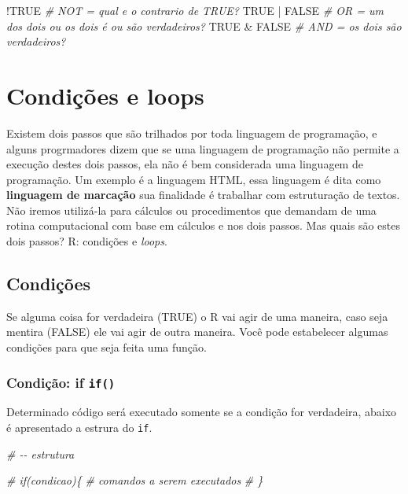 \documentclass[
]{book}
\newenvironment{Shaded}{\begin{snugshade}}{\end{snugshade}}
\newcommand{\CommentTok}[1]{\textcolor[rgb]{0.56,0.35,0.01}{\textit{#1}}}
\newcommand{\ConstantTok}[1]{\textcolor[rgb]{0.00,0.00,0.00}{#1}}
\newcommand{\SpecialCharTok}[1]{\textcolor[rgb]{0.00,0.00,0.00}{#1}}
\begin{document}
\begin{Shaded}
\begin{Highlighting}[]
\SpecialCharTok{!}\ConstantTok{TRUE} \CommentTok{\# NOT = qual e o contrario de TRUE?}
\ConstantTok{TRUE} \SpecialCharTok{|} \ConstantTok{FALSE} \CommentTok{\# OR = um dos dois ou os dois é ou são verdadeiros?}
\ConstantTok{TRUE} \SpecialCharTok{\&} \ConstantTok{FALSE} \CommentTok{\# AND = os dois são verdadeiros?}
\end{Highlighting}
\end{Shaded}

\hypertarget{condiuxe7uxf5es-e-loops}{%
\section{Condições e loops}\label{condiuxe7uxf5es-e-loops}}

Existem dois passos que são trilhados por toda linguagem de programação, e alguns progrmadores dizem que se uma linguagem de programação não permite a execução destes dois passos, ela não é bem considerada uma linguagem de programação. Um exemplo é a linguagem HTML, essa linguagem é dita como \textbf{linguagem de marcação} sua finalidade é trabalhar com estruturação de textos. Não iremos utilizá-la para cálculos ou procedimentos que demandam de uma rotina computacional com base em cálculos e nos dois passos. Mas quais são estes dois passos? R: condições e \emph{loops}.

\hypertarget{condiuxe7uxf5es}{%
\subsection{Condições}\label{condiuxe7uxf5es}}

Se alguma coisa for verdadeira (TRUE) o R vai agir de uma maneira, caso seja mentira (FALSE) ele vai agir de outra maneira. Você pode estabelecer algumas condições para que seja feita uma função.

\hypertarget{condiuxe7uxe3o-if-if}{%
\subsubsection{\texorpdfstring{Condição: if \texttt{if()}}{Condição: if if()}}\label{condiuxe7uxe3o-if-if}}

Determinado código será executado somente se a condição for verdadeira, abaixo é apresentado a estrura do \texttt{if}.

\begin{Shaded}
\begin{Highlighting}[]
\CommentTok{\# {-}{-} estrutura}

\CommentTok{\# if(condicao)\{}
\CommentTok{\#   comandos a serem executados}
\CommentTok{\# \}}
\end{Highlighting}
\end{Shaded}
\end{document}
